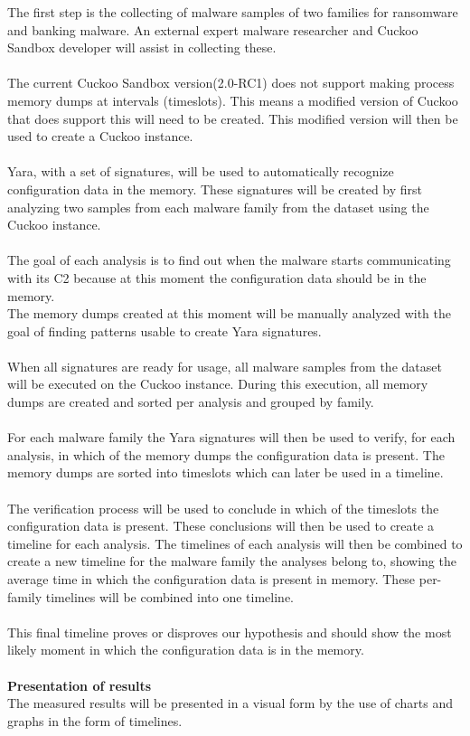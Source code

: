 \documentclass[conference]{IEEEtran}
\begin{document}
The first step is the collecting of malware samples of two families for ransomware and banking malware. An external expert malware researcher and Cuckoo Sandbox developer will assist in collecting these. \\\\The current Cuckoo Sandbox version(2.0-RC1) does not support making process memory  dumps at intervals (timeslots). This means a modified version of Cuckoo that does support this will need to be created. This modified version will then be used to create a Cuckoo instance.\\\\Yara, with a set of signatures, will be used to automatically recognize configuration data in the memory. These signatures will be created by first analyzing two samples from each malware family from the dataset using the Cuckoo instance. \\\\The goal of each analysis is to find out when the malware starts communicating with its C2 because at this moment the configuration data should be in the memory.\\The memory dumps created at this moment will be manually analyzed with the goal of finding patterns usable to create Yara signatures.\\\\ When all signatures are ready for usage, all malware samples from the dataset will be executed on the Cuckoo instance. During this execution, all memory dumps are created and sorted per analysis and grouped by family.\\\\For each malware family the Yara signatures will then be used to verify, for each analysis, in which of the memory dumps the configuration data is present. The memory dumps are sorted into timeslots which can later be used in a timeline.\\\\The verification process will be used to conclude in which of the timeslots the configuration data is present. These conclusions will then be used to create a timeline for each analysis.  The timelines of each analysis will then be combined to create a new timeline for the malware family the analyses belong to, showing the average time in which the configuration data is present in memory. These per-family timelines will be combined into one timeline. \\\\This final timeline proves or disproves our hypothesis and should show the most likely moment in which the configuration data is in the memory.\\\\ \textbf{Presentation of results}\\
The measured results will be presented in a visual form by the use of charts and graphs in the form of timelines.
\end{document}
